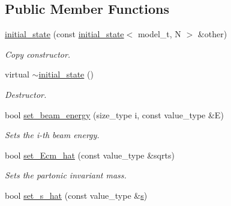 \subsection*{Public Member Functions}
\begin{DoxyCompactItemize}
\item 
\hypertarget{a00304_a299129496429ce21025664f4c66d9162}{\hyperlink{a00304_a299129496429ce21025664f4c66d9162}{initial\-\_\-state} (const \hyperlink{a00304}{initial\-\_\-state}$<$ model\-\_\-t, N $>$ \&other)}\label{a00304_a299129496429ce21025664f4c66d9162}

\begin{DoxyCompactList}\small\item\em Copy constructor. \end{DoxyCompactList}\item 
\hypertarget{a00304_ac46117175110b3d84fd7ae58a4cb2197}{virtual \hyperlink{a00304_ac46117175110b3d84fd7ae58a4cb2197}{$\sim$initial\-\_\-state} ()}\label{a00304_ac46117175110b3d84fd7ae58a4cb2197}

\begin{DoxyCompactList}\small\item\em Destructor. \end{DoxyCompactList}\item 
\hypertarget{a00304_a89a407740ec37bb376b90fe4c99111bc}{bool \hyperlink{a00304_a89a407740ec37bb376b90fe4c99111bc}{set\-\_\-beam\-\_\-energy} (size\-\_\-type i, const value\-\_\-type \&E)}\label{a00304_a89a407740ec37bb376b90fe4c99111bc}

\begin{DoxyCompactList}\small\item\em Sets the i-\/th beam energy. \end{DoxyCompactList}\item 
\hypertarget{a00304_a59bd8c60ac447b66745a72868ae6b92c}{bool \hyperlink{a00304_a59bd8c60ac447b66745a72868ae6b92c}{set\-\_\-\-Ecm\-\_\-hat} (const value\-\_\-type \&sqrts)}\label{a00304_a59bd8c60ac447b66745a72868ae6b92c}

\begin{DoxyCompactList}\small\item\em Sets the partonic invariant mass. \end{DoxyCompactList}\item 
\hypertarget{a00304_a2f27a98319a0ffe3e77ddb5166a99ed8}{bool \hyperlink{a00304_a2f27a98319a0ffe3e77ddb5166a99ed8}{set\-\_\-s\-\_\-hat} (const value\-\_\-type \&\hyperlink{a00304_ae2984255cbdaabc293b8168d93c767bf}{s})}\label{a00304_a2f27a98319a0ffe3e77ddb5166a99ed8}


\end{DoxyCompactItemize}
